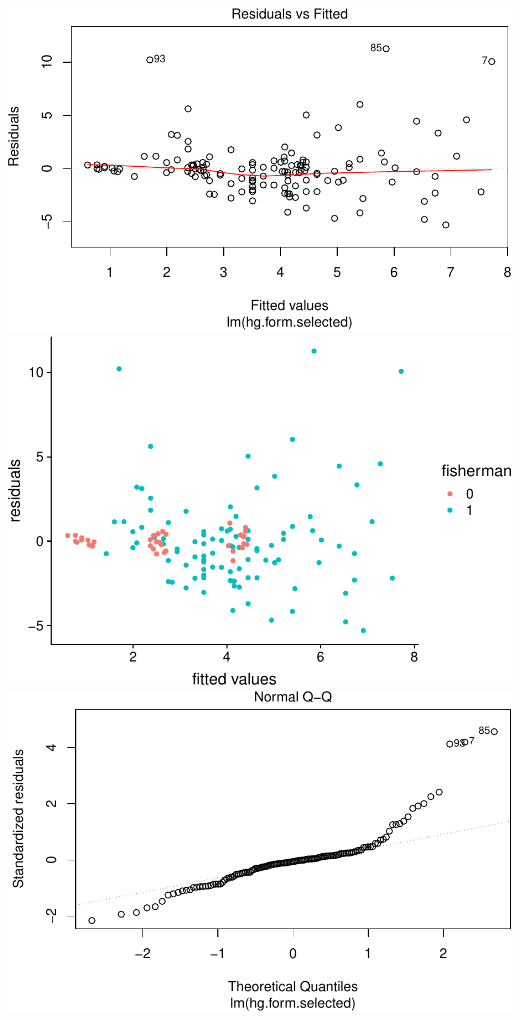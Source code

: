 \documentclass[12pt,]{article}
\begin{document}
\includegraphics{Report_files/figure-latex/unnamed-chunk-16-1.pdf}
\includegraphics{Report_files/figure-latex/unnamed-chunk-16-2.pdf}
\includegraphics{Report_files/figure-latex/unnamed-chunk-16-3.pdf}
\end{document}
